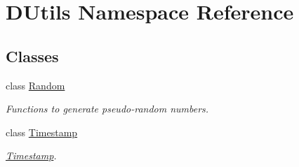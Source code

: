 \hypertarget{namespace_d_utils}{}\section{D\+Utils Namespace Reference}
\label{namespace_d_utils}
\subsection*{Classes}
\begin{DoxyCompactItemize}
\item 
class \mbox{\hyperlink{class_d_utils_1_1_random}{Random}}
\begin{DoxyCompactList}\small\item\em Functions to generate pseudo-\/random numbers. \end{DoxyCompactList}\item 
class \mbox{\hyperlink{class_d_utils_1_1_timestamp}{Timestamp}}
\begin{DoxyCompactList}\small\item\em \mbox{\hyperlink{class_d_utils_1_1_timestamp}{Timestamp}}. \end{DoxyCompactList}\end{DoxyCompactItemize}
